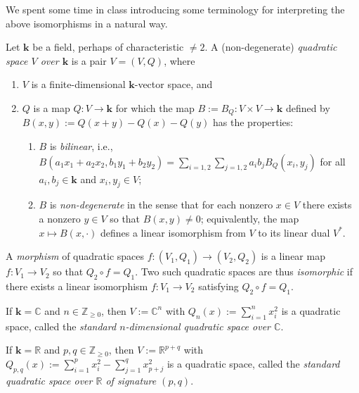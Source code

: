 \documentclass[reqno]{amsart} 
\begin{document}
We spent some time in class introducing some terminology for
interpreting
the above isomorphisms in a natural way.
\begin{definition}
  Let $\mathbf{k}$ be a field, perhaps of characteristic $\neq
  2$.
  A (non-degenerate) \emph{quadratic space $V$ over $\mathbf{k}$}
  is a pair $V = (V,Q)$, where
  \begin{enumerate}
  \item $V$ is a finite-dimensional $\mathbf{k}$-vector space,
    and
  \item $Q$ is a map $Q : V \rightarrow \mathbf{k}$ for which
    the map $B := B_Q : V \times V \rightarrow \mathbf{k}$
    defined by $B(x,y) := Q(x+y) - Q(x) - Q(y)$ has the
    properties:
    \begin{enumerate}
    \item $B$ is \emph{bilinear}, i.e.,
      $B(a_1 x_1 + a_2 x_2, b_1 y_1 + b_2 y_2)
      = \sum_{i=1,2} \sum_{j=1,2} a_i b_j B_Q(x_i,y_j)$
      for all $a_i,b_j \in \mathbf{k}$
      and $x_i,y_j \in V$;
    \item $B$ is \emph{non-degenerate}
      in the sense that
      for each nonzero $x \in V$ there exists a nonzero $y \in
      V$
      so that $B(x,y) \neq 0$; equivalently,
      the map $x \mapsto B(x,\cdot)$ defines a linear isomorphism
      from $V$ to its linear dual $V^*$.
    \end{enumerate}
  \end{enumerate}
  A \emph{morphism} of quadratic spaces
  $f : (V_1,Q_1) \rightarrow (V_2,Q_2)$
  is a linear map $f : V_1 \rightarrow V_2$
  so that $Q_2 \circ f = Q_1$.
  Two such quadratic spaces are thus \emph{isomorphic}
  if there exists a linear isomorphism
  $f : V_1 \rightarrow V_2$
  satisfying $Q_2 \circ f = Q_1$.
\end{definition}
\begin{example}
  If $\mathbf{k} = \mathbb{C}$ and $n \in \mathbb{Z}_{\geq 0}$,
  then $V := \mathbb{C}^n$
  with $Q_{n}(x) := \sum_{i=1}^n x_i^2$
  is a quadratic space, called the \emph{standard
    $n$-dimensional
    quadratic space over $\mathbb{C}$}.
\end{example}
\begin{example}
  If $\mathbf{k} = \mathbb{R}$ and $p,q \in \mathbb{Z}_{\geq 0}$,
  then $V := \mathbb{R}^{p+q}$
  with $Q_{p,q}(x) := \sum_{i=1}^p x_i^2 - \sum_{j=1}^q x_{p+j}^2$
  is a quadratic space,
  called
  the \emph{standard
    quadratic space over $\mathbb{R}$ of signature $(p,q)$}.
\end{example}
\end{document}
